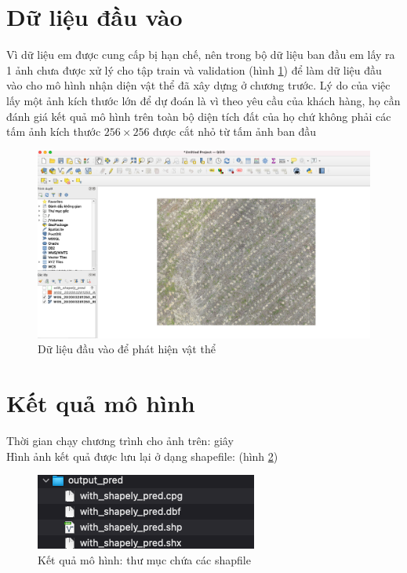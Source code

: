 \documentclass[a4paper, 12pt]{report}
\begin{document}
\section{Dữ liệu đầu vào}
Vì dữ liệu em được cung cấp bị hạn chế, nên trong bộ dữ liệu ban đầu em lấy ra 1 ảnh chưa được xử lý cho tập train và validation (hình \ref{fig:demo}) để làm dữ liệu đầu vào cho mô hình nhận diện vật thể đã xây dựng ở chương trước.  Lý do của việc lấy một ảnh kích thước lớn để dự đoán là vì theo yêu cầu của khách hàng,  họ cần đánh giá kết quả mô hình trên toàn bộ diện tích đất của họ chứ không phải các tấm ảnh kích thước $256 \times 256$ được cắt nhỏ từ tấm ảnh ban đầu
 \begin{figure}[!h]
	\centering
	\includegraphics[width=1\linewidth]{Images/demo}
	\caption{Dữ liệu đầu vào để phát hiện vật thể}
	\label{fig:demo}
\end{figure}

\section{Kết quả mô hình}
Thời gian chạy chương trình cho ảnh trên: giây \\
Hình ảnh kết quả được lưu lại ở dạng shapefile: 	(hình \ref{fig:shpfile_demo_result})
 \begin{figure}[!h]
	\centering
	\includegraphics[width=0.5\linewidth]{Images/shpfile_demo_result}
	\caption{Kết quả mô hình: thư mục chứa các shapfile}
	\label{fig:shpfile_demo_result}
\end{figure}
\end{document}
